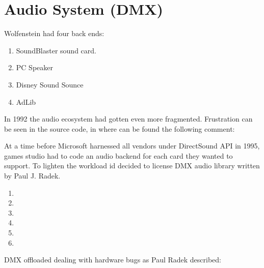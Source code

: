 \section{Audio System (DMX)}


Wolfenstein had four back ends:
\begin{enumerate}
\item SoundBlaster sound card.
\item PC Speaker
\item Disney Sound Sounce
\item AdLib
\end{enumerate}

In 1992 the audio ecosystem had gotten even more fragmented. Frustration can be seen in the source code, in  where can be found the following comment:\\
\par
{}
\par
At a time before Microsoft harnessed all vendors under DirectSound API in 1995, games studio had to code an audio backend for each card they wanted to support. To lighten the workload id decided to license DMX audio library written by Paul J. Radek.\\
\par
\begin{enumerate}
\item 
\item 
\item 
\item 
\item 
\item 
\end{enumerate}

DMX offloaded dealing with hardware bugs as Paul Radek described:

